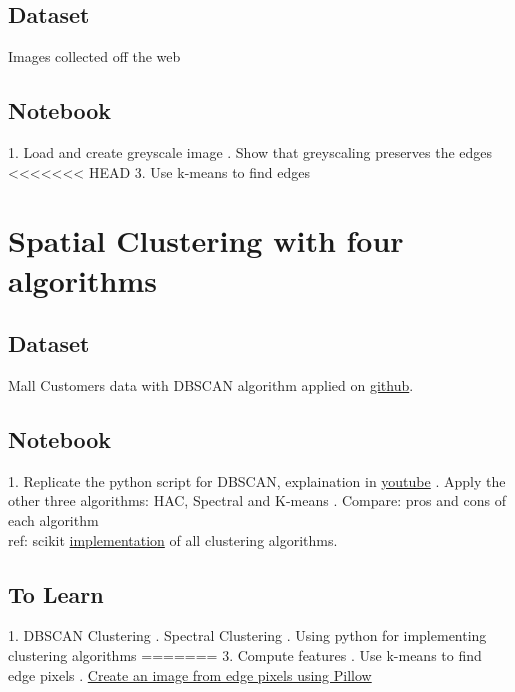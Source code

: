 \documentclass{article}
\begin{document}
\subsection*{Dataset} Images collected off the web

\subsection*{Notebook}
1. Load and create greyscale image
. Show that greyscaling preserves the edges
\newline
<<<<<<< HEAD
3. Use k-means to find edges
\section*{Spatial Clustering with four algorithms}
\subsection*{Dataset} Mall Customers data with DBSCAN algorithm applied on \href{https://github.com/krishnaik06/DBSCAN-Algorithm}{github}.

\subsection*{Notebook}
1. Replicate the python script for DBSCAN, explaination in \href{https://www.youtube.com/watch?v=C3r7tGRe2eI}{youtube}
. Apply the other three algorithms: HAC, Spectral and K-means
. Compare: pros and cons of each algorithm\\ ref: scikit \href{https://scikit-learn.org/stable/auto_examples/cluster/plot_cluster_comparison.html#sphx-glr-auto-examples-cluster-plot-cluster-comparison-py}{implementation} of all clustering algorithms.
\subsection*{To Learn}
1. DBSCAN Clustering
. Spectral Clustering
. Using python for implementing clustering algorithms
=======
3. Compute features
. Use k-means to find edge pixels
. \href{https://stackoverflow.com/questions/434583/what-is-the-fastest-way-to-draw-an-image-from-discrete-pixel-values-in-python}{Create an image from edge pixels using Pillow}
\end{document}
